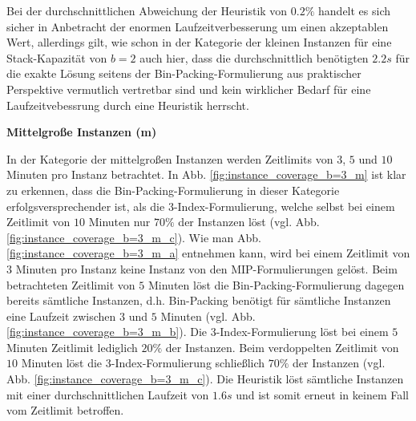 Bei der durchschnittlichen Abweichung der Heuristik von $0.2 \%$ handelt es sich sicher in Anbetracht
der enormen Laufzeitverbesserung um einen akzeptablen Wert, allerdings gilt, wie schon in der Kategorie
der kleinen Instanzen für eine Stack-Kapazität von $b = 2$ auch hier, dass die durchschnittlich benötigten $2.2s$
für die exakte Lösung seitens der Bin-Packing-Formulierung aus praktischer Perspektive vermutlich vertretbar sind
und kein wirklicher Bedarf für eine Laufzeitvebessrung durch eine Heuristik herrscht.

\textbf{Mittelgroße Instanzen (m)}

In der Kategorie der mittelgroßen Instanzen werden Zeitlimits von $3$, $5$ und $10$ Minuten pro Instanz betrachtet.
In Abb. \ref{fig:instance_coverage_b=3_m} ist klar zu erkennen, dass die Bin-Packing-Formulierung in dieser Kategorie erfolgsversprechender ist, als die 3-Index-Formulierung, welche selbst bei einem Zeitlimit von $10$ Minuten nur $70 \%$ der Instanzen löst (vgl. Abb. \ref{fig:instance_coverage_b=3_m_c}).
Wie man Abb. \ref{fig:instance_coverage_b=3_m_a} entnehmen kann, wird bei einem Zeitlimit von $3$ Minuten pro Instanz keine Instanz von den MIP-Formulierungen gelöst. Beim betrachteten Zeitlimit von $5$ Minuten löst die Bin-Packing-Formulierung dagegen bereits sämtliche Instanzen, d.h. Bin-Packing benötigt für sämtliche Instanzen eine Laufzeit zwischen $3$ und $5$ Minuten (vgl. Abb. \ref{fig:instance_coverage_b=3_m_b}). Die 3-Index-Formulierung löst bei einem $5$ Minuten Zeitlimit lediglich $20 \%$ der Instanzen.
Beim verdoppelten Zeitlimit von $10$ Minuten löst die 3-Index-Formulierung schließlich $70 \%$ der Instanzen (vgl. Abb. \ref{fig:instance_coverage_b=3_m_c}).
Die Heuristik löst sämtliche Instanzen mit einer durchschnittlichen Laufzeit von $1.6s$ und ist somit erneut
in keinem Fall vom Zeitlimit betroffen.

